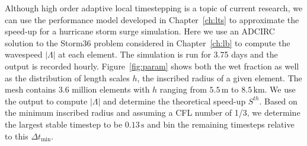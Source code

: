 Although high order adaptive local timestepping is a topic of current research, we can use the performance model developed in Chapter~\ref{ch:lts} to approximate the speed-up for a hurricane storm surge simulation. Here we use an ADCIRC solution to the Storm36 problem considered in Chapter~\ref{ch:lb} to compute the wavespeed $|\Lambda|$ at each element. The simulation is run for 3.75 days and the output is recorded hourly. Figure~\ref{fig:param} shows both the wet fraction as well as the distribution of length scales $h$, the inscribed radius of a given element. The mesh contains 3.6 million elements with $h$ ranging from $5.5\,\mathrm{m}$ to $8.5\,\mathrm{km}$. We use the output to compute $|\Lambda|$ and determine the theoretical speed-up $S^{th}$. Based on the minimum inscribed radius and assuming a CFL number of 1/3, we determine the largest stable timestep to be $0.13 \,\mathrm{s}$ and bin the remaining timesteps relative to this $\Delta t_{\min}$. 
